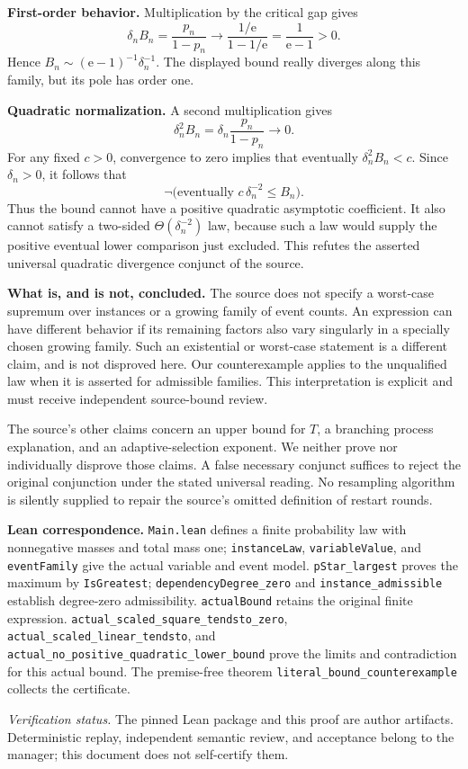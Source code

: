 \documentclass[11pt]{article}
\newcommand{\E}{\mathrm e}
\newcommand{\B}{B}
\begin{document}
\textbf{First-order behavior.} Multiplication by the critical gap gives
\[
 \delta_n\B_n=\frac{p_n}{1-p_n}
   \longrightarrow
   \frac{1/\E}{1-1/\E}
   =\frac1{\E-1}>0.
\]
Hence \(\B_n\sim(\E-1)^{-1}\delta_n^{-1}\). The displayed bound really
diverges along this family, but its pole has order one.

\textbf{Quadratic normalization.} A second multiplication gives
\[
 \delta_n^2\B_n
   =\delta_n\frac{p_n}{1-p_n}
   \longrightarrow0.
\]
For any fixed \(c>0\), convergence to zero implies that eventually
\(\delta_n^2\B_n<c\). Since \(\delta_n>0\), it follows that
\[
 \neg\bigl(\text{eventually }c\,\delta_n^{-2}\leq\B_n\bigr).
\]
Thus the bound cannot have a positive quadratic asymptotic coefficient.
It also cannot satisfy a two-sided \(\Theta(\delta_n^{-2})\) law, because
such a law would supply the positive eventual lower comparison just
excluded. This refutes the asserted universal quadratic divergence
conjunct of the source.

\textbf{What is, and is not, concluded.} The source does not specify a
worst-case supremum over instances or a growing family of event counts.
An expression can have different behavior if its remaining factors
also vary singularly in a specially chosen growing family. Such an
existential or worst-case statement is a different claim, and is not
disproved here. Our counterexample applies to the unqualified law when
it is asserted for admissible families. This interpretation is explicit
and must receive independent source-bound review.

The source's other claims concern an upper bound for \(T\), a branching
process explanation, and an adaptive-selection exponent. We neither
prove nor individually disprove those claims. A false necessary
conjunct suffices to reject the original conjunction under the stated
universal reading. No resampling algorithm is silently supplied to
repair the source's omitted definition of restart rounds.

\textbf{Lean correspondence.} \texttt{Main.lean} defines a finite
probability law with nonnegative masses and total mass one;
\texttt{instanceLaw}, \texttt{variableValue}, and \texttt{eventFamily}
give the actual variable and event model.
\texttt{pStar\_largest} proves the maximum by
\texttt{IsGreatest}; \texttt{dependencyDegree\_zero} and
\texttt{instance\_admissible} establish degree-zero admissibility.
\texttt{actualBound} retains the original finite expression.
\texttt{actual\_scaled\_square\_tendsto\_zero},
\texttt{actual\_scaled\_linear\_tendsto}, and
\texttt{actual\_no\_positive\_quadratic\_lower\_bound} prove the limits
and contradiction for this actual bound. The premise-free theorem
\texttt{literal\_bound\_counterexample} collects the certificate.

\textit{Verification status.} The pinned Lean package and this proof
are author artifacts. Deterministic replay, independent semantic
review, and acceptance belong to the manager; this document does not
self-certify them.
\end{document}
